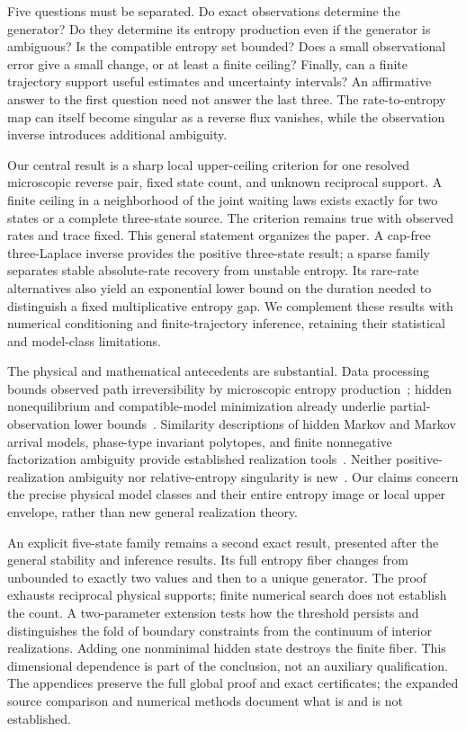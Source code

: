 \documentclass[aps,pre,onecolumn,11pt,longbibliography,notitlepage]{revtex4-2}
\newcommand{\1}{\mathbf 1}
\begin{document}
Five questions must be separated. Do exact observations determine the generator? Do they determine its entropy production even if the generator is ambiguous? Is the compatible entropy set bounded? Does a small observational error give a small change, or at least a finite ceiling? Finally, can a finite trajectory support useful estimates and uncertainty intervals? An affirmative answer to the first question need not answer the last three. The rate-to-entropy map can itself become singular as a reverse flux vanishes, while the observation inverse introduces additional ambiguity.

Our central result is a sharp local upper-ceiling criterion for one resolved microscopic reverse pair, fixed state count, and unknown reciprocal support. A finite ceiling in a neighborhood of the joint waiting laws exists exactly for two states or a complete three-state source. The criterion remains true with observed rates and trace fixed. This general statement organizes the paper. A cap-free three-Laplace inverse provides the positive three-state result; a sparse family separates stable absolute-rate recovery from unstable entropy. Its rare-rate alternatives also yield an exponential lower bound on the duration needed to distinguish a fixed multiplicative entropy gap. We complement these results with numerical conditioning and finite-trajectory inference, retaining their statistical and model-class limitations.

The physical and mathematical antecedents are substantial. Data processing bounds observed path irreversibility by microscopic entropy production~\cite{vanDerMeer2022,Harunari2022}; hidden nonequilibrium and compatible-model minimization already underlie partial-observation lower bounds~\cite{WagnerTimmer2000,Ehrich2021,Nitzan2023}. Similarity descriptions of hidden Markov and Markov arrival models, phase-type invariant polytopes, and finite nonnegative factorization ambiguity provide established realization tools~\cite{Vanluyten2008,HorvathTelek2007,HeZhang2006,Mond2003}. Neither positive-realization ambiguity nor relative-entropy singularity is new~\cite{Zeraati2012,SasonVerdu2016}. Our claims concern the precise physical model classes and their entire entropy image or local upper envelope, rather than new general realization theory.

An explicit five-state family remains a second exact result, presented after the general stability and inference results. Its full entropy fiber changes from unbounded to exactly two values and then to a unique generator. The proof exhausts reciprocal physical supports; finite numerical search does not establish the count. A two-parameter extension tests how the threshold persists and distinguishes the fold of boundary constraints from the continuum of interior realizations. Adding one nonminimal hidden state destroys the finite fiber. This dimensional dependence is part of the conclusion, not an auxiliary qualification. The appendices preserve the full global proof and exact certificates; the expanded source comparison and numerical methods document what is and is not established.
\end{document}
